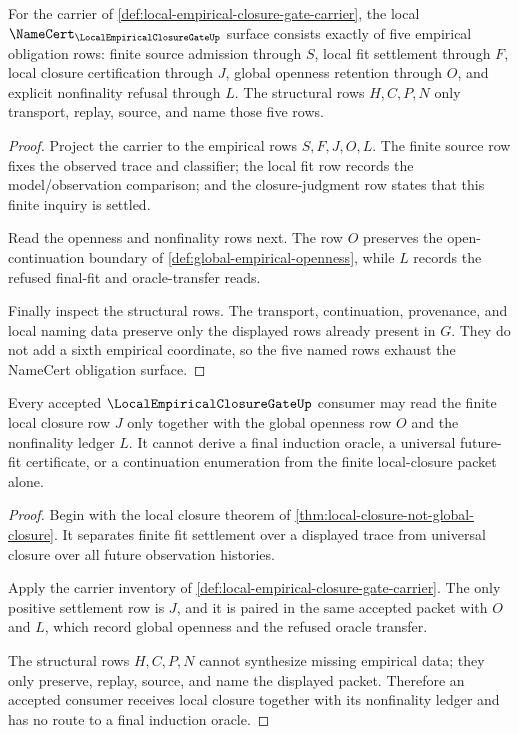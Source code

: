 \begin{theorem}
\label{thm:local-empirical-closure-gate-namecert-obligations}
For the carrier of \autoref{def:local-empirical-closure-gate-carrier}, the local $\NameCert_{\LocalEmpiricalClosureGateUp}$ surface consists exactly of five empirical obligation rows: finite source admission through $S$, local fit settlement through $F$, local closure certification through $J$, global openness retention through $O$, and explicit nonfinality refusal through $L$. The structural rows $H,C,P,N$ only transport, replay, source, and name those five rows.
\end{theorem}
\begin{proof}
Project the carrier to the empirical rows $S,F,J,O,L$. The finite source row fixes the observed trace and classifier; the local fit row records the model/observation comparison; and the closure-judgment row states that this finite inquiry is settled.

Read the openness and nonfinality rows next. The row $O$ preserves the open-continuation boundary of \autoref{def:global-empirical-openness}, while $L$ records the refused final-fit and oracle-transfer reads.

Finally inspect the structural rows. The transport, continuation, provenance, and local naming data preserve only the displayed rows already present in $G$. They do not add a sixth empirical coordinate, so the five named rows exhaust the NameCert obligation surface.
\end{proof}

\begin{theorem}
\label{thm:local-empirical-closure-gate-nonfinality}
Every accepted $\LocalEmpiricalClosureGateUp$ consumer may read the finite local closure row $J$ only together with the global openness row $O$ and the nonfinality ledger $L$. It cannot derive a final induction oracle, a universal future-fit certificate, or a continuation enumeration from the finite local-closure packet alone.
\end{theorem}
\begin{proof}
Begin with the local closure theorem of \autoref{thm:local-closure-not-global-closure}. It separates finite fit settlement over a displayed trace from universal closure over all future observation histories.

Apply the carrier inventory of \autoref{def:local-empirical-closure-gate-carrier}. The only positive settlement row is $J$, and it is paired in the same accepted packet with $O$ and $L$, which record global openness and the refused oracle transfer.

The structural rows $H,C,P,N$ cannot synthesize missing empirical data; they only preserve, replay, source, and name the displayed packet. Therefore an accepted consumer receives local closure together with its nonfinality ledger and has no route to a final induction oracle.
\end{proof}

